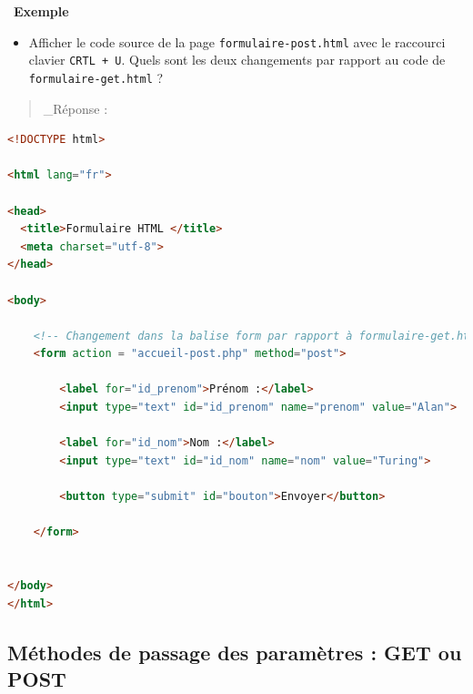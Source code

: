 \documentclass[
  11pt,
]{article}
\newcommand{\passthrough}[1]{#1}
\providecommand{\tightlist}{%
  \setlength{\itemsep}{0pt}\setlength{\parskip}{0pt}}
\newcounter{exple}
\newenvironment{exemple}[1]
{\par \medskip   \addtocounter{exple}{1} \noindent  
\begin{bclogo}[arrondi =0.1,   noborder = true, logo=\bclampe, marge=4]{~\textbf{Exemple} \textbf{\theexple} {\itshape #1} }  \par}
{
\end{bclogo}
 \par \bigskip }
\begin{document}
\begin{exemple}{}
\begin{enumerate}
  \begin{itemize}
  \tightlist
  \item
    Afficher le code source de la page
    \passthrough{\lstinline!formulaire-post.html!} avec le raccourci
    clavier \passthrough{\lstinline!CRTL + U!}. Quels sont les deux
    changements par rapport au code de
    \passthrough{\lstinline!formulaire-get.html!} ?
  \end{itemize}

  \begin{quote}
  \_Réponse :
  \end{quote}
\end{enumerate}

\begin{lstlisting}[language=HTML]
 <!DOCTYPE html>

<html lang="fr">

<head>
  <title>Formulaire HTML </title>
  <meta charset="utf-8">    
</head>
 
<body>

    <!-- Changement dans la balise form par rapport à formulaire-get.html : la cible et la méthode  -->
    <form action = "accueil-post.php" method="post">
        
        <label for="id_prenom">Prénom :</label>
        <input type="text" id="id_prenom" name="prenom" value="Alan">

        <label for="id_nom">Nom :</label>
        <input type="text" id="id_nom" name="nom" value="Turing">

        <button type="submit" id="bouton">Envoyer</button>

    </form>


</body>
</html> 
\end{lstlisting}

\end{exemple}

\hypertarget{muxe9thodes-de-passage-des-paramuxe8tres-get-ou-post}{%
\subsection{Méthodes de passage des paramètres : GET ou
POST}\label{muxe9thodes-de-passage-des-paramuxe8tres-get-ou-post}}
\end{document}
